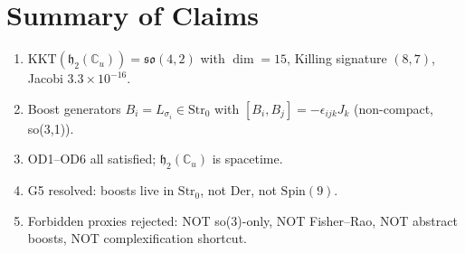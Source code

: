 \section{Summary of Claims}

\begin{enumerate}
  \item $\mathrm{KKT}(\mathfrak{h}_2(\mathbb{C}_u)) = \mathfrak{so}(4,2)$
    with $\dim = 15$, Killing signature $(8,7)$, Jacobi $3.3 \times 10^{-16}$.
  \item Boost generators $B_i = L_{\sigma_i} \in \mathrm{Str}_0$
    with $[B_i, B_j] = -\epsilon_{ijk} J_k$ (non-compact, so(3,1)).
  \item OD1--OD6 all satisfied; $\mathfrak{h}_2(\mathbb{C}_u)$ is spacetime.
  \item G5 resolved: boosts live in $\mathrm{Str}_0$, not $\mathrm{Der}$,
    not $\mathrm{Spin}(9)$.
  \item Forbidden proxies rejected: NOT so(3)-only, NOT Fisher--Rao,
    NOT abstract boosts, NOT complexification shortcut.
\end{enumerate}

